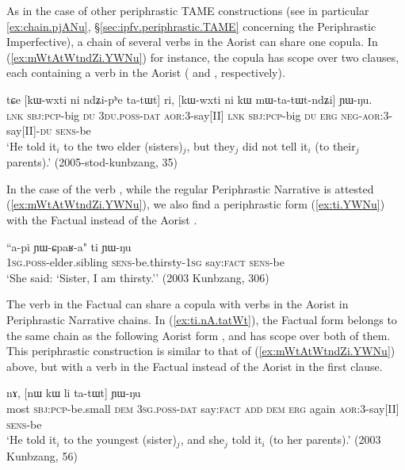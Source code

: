 As in the case of other periphrastic TAME constructions (see in particular \ref{ex:chain.pjANu}, §\ref{sec:ipfv.periphrastic.TAME} concerning the Periphrastic Imperfective), a chain of several verbs in the Aorist can share one copula. In (\ref{ex:mWtAtWtndZi.YWNu}) for instance, the copula  has scope over two clauses, each containing a verb in the Aorist ( and , respectively).

\begin{exe}
\ex \label{ex:mWtAtWtndZi.YWNu}
\gll tɕe [kɯ-wxti ni ndʑi-pʰe ta-tɯt] ri, [kɯ-wxti ni kɯ mɯ-ta-tɯt-ndʑi] ɲɯ-ŋu. \\
\textsc{lnk} \textsc{sbj}:\textsc{pcp}-big \textsc{du} \textsc{3du}.\textsc{poss}-\textsc{dat} \textsc{aor}:3\flobv{}-say[II] \textsc{lnk} \textsc{sbj}:\textsc{pcp}-big \textsc{du} \textsc{erg} \textsc{neg}-\textsc{aor}:3\flobv{}-say[II]-\textsc{du} \textsc{sens}-be \\
\glt `He told it$_i$ to the two elder (sisters)$_j$, but they$_j$ did not tell it$_i$ (to their$_j$ parents).' (2005-stod-kunbzang, 35)
\end{exe}

In the case of the verb , while the regular Periphrastic Narrative is attested (\ref{ex:mWtAtWtndZi.YWNu}), we also find a periphrastic form  (\ref{ex:ti.YWNu}) with the Factual  instead of the Aorist .

\begin{exe}
\ex \label{ex:ti.YWNu}
\gll ``a-pi ɲɯ-ɕpaʁ-a" ti ɲɯ-ŋu \\
\textsc{1sg}.\textsc{poss}-elder.sibling \textsc{sens}-be.thirsty-\textsc{1sg} say:\textsc{fact} \textsc{sens}-be \\
\glt `She said: `Sister, I am thirsty.'' (2003 Kunbzang, 306)
\end{exe}

The verb  in the Factual can share a copula with verbs in the Aorist in Periphrastic Narrative chains. In (\ref{ex:ti.nA.tatWt}), the Factual form  belongs to the same chain as the following Aorist form , and  has scope over both of them. This periphrastic construction is similar to that of (\ref{ex:mWtAtWtndZi.YWNu}) above, but with a verb in the Factual instead of the Aorist in the first clause.

\begin{exe}
\ex \label{ex:ti.nA.tatWt}
 nɤ, [nɯ kɯ li ta-tɯt] ɲɯ-ŋu \\
most \textsc{sbj}:\textsc{pcp}-be.small \textsc{dem} \textsc{3sg}.\textsc{poss}-\textsc{dat} say:\textsc{fact} \textsc{add} \textsc{dem} \textsc{erg} again \textsc{aor}:3\flobv{}-say[II] \textsc{sens}-be \\
\glt `He told it$_i$ to the youngest (sister)$_j$, and she$_j$ told it$_i$ (to her parents).' (2003 Kunbzang, 56)
\end{exe}
 

